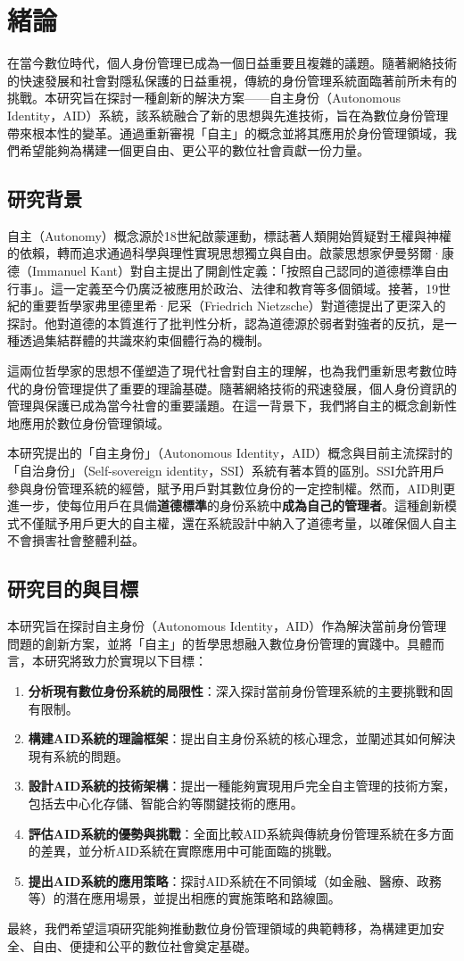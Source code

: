 
\chapter{緒論}
在當今數位時代，個人身份管理已成為一個日益重要且複雜的議題。隨著網絡技術的快速發展和社會對隱私保護的日益重視，傳統的身份管理系統面臨著前所未有的挑戰。本研究旨在探討一種創新的解決方案——自主身份（Autonomous Identity，AID）系統，該系統融合了新的思想與先進技術，旨在為數位身份管理帶來根本性的變革。通過重新審視「自主」的概念並將其應用於身份管理領域，我們希望能夠為構建一個更自由、更公平的數位社會貢獻一份力量。
\section{研究背景}
自主（Autonomy）概念源於18世紀啟蒙運動，標誌著人類開始質疑對王權與神權的依賴，轉而追求通過科學與理性實現思想獨立與自由。啟蒙思想家伊曼努爾·康德（Immanuel Kant）對自主提出了開創性定義：「按照自己認同的道德標準自由行事」。這一定義至今仍廣泛被應用於政治、法律和教育等多個領域。接著，19世紀的重要哲學家弗里德里希·尼采（Friedrich Nietzsche）對道德提出了更深入的探討。他對道德的本質進行了批判性分析，認為道德源於弱者對強者的反抗，是一種透過集結群體的共識來約束個體行為的機制。

這兩位哲學家的思想不僅塑造了現代社會對自主的理解，也為我們重新思考數位時代的身份管理提供了重要的理論基礎。隨著網絡技術的飛速發展，個人身份資訊的管理與保護已成為當今社會的重要議題。在這一背景下，我們將自主的概念創新性地應用於數位身份管理領域。

本研究提出的「自主身份」（Autonomous Identity，AID）概念與目前主流探討的「自治身份」（Self-sovereign identity，SSI）系統有著本質的區別。SSI允許用戶參與身份管理系統的經營，賦予用戶對其數位身份的一定控制權。然而，AID則更進一步，使每位用戶在具備\textbf{道德標準}的身份系統中\textbf{成為自己的管理者}。這種創新模式不僅賦予用戶更大的自主權，還在系統設計中納入了道德考量，以確保個人自主不會損害社會整體利益。
\section{研究目的與目標}
本研究旨在探討自主身份（Autonomous Identity，AID）作為解決當前身份管理問題的創新方案，並將「自主」的哲學思想融入數位身份管理的實踐中。具體而言，本研究將致力於實現以下目標：
\begin{enumerate}
  \item \textbf{分析現有數位身份系統的局限性}：深入探討當前身份管理系統的主要挑戰和固有限制。
  \item \textbf{構建AID系統的理論框架}：提出自主身份系統的核心理念，並闡述其如何解決現有系統的問題。
  \item \textbf{設計AID系統的技術架構}：提出一種能夠實現用戶完全自主管理的技術方案，包括去中心化存儲、智能合約等關鍵技術的應用。
  \item \textbf{評估AID系統的優勢與挑戰}：全面比較AID系統與傳統身份管理系統在多方面的差異，並分析AID系統在實際應用中可能面臨的挑戰。
  \item \textbf{提出AID系統的應用策略}：探討AID系統在不同領域（如金融、醫療、政務等）的潛在應用場景，並提出相應的實施策略和路線圖。
\end{enumerate}
最終，我們希望這項研究能夠推動數位身份管理領域的典範轉移，為構建更加安全、自由、便捷和公平的數位社會奠定基礎。
